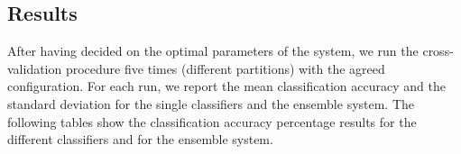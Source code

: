 \documentclass[a4paper,11pt,oneside]{article}
\begin{document}
\subsection{Results}
After having decided on the optimal parameters of the system, we run the cross-validation procedure
five times (different partitions) with the agreed configuration. For each run, we report the mean classification accuracy
and the standard deviation for the single classifiers and the ensemble system. The following tables 
show the classification accuracy percentage results for the different classifiers and for the ensemble system. 
\begin{table}[h]
  \centering
  \caption{Classification Accuracy for Logistic Regression}
  \label{logtable}
  \end{table}
\end{document}
